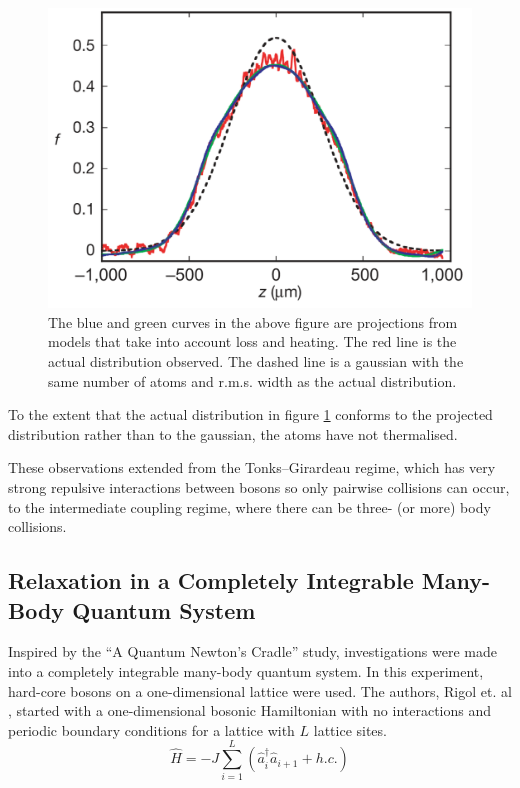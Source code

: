 \documentclass[a4paper, 10pt]{article}
\theoremstyle{plain}
\begin{document}
\begin{figure}[H]
    \begin{center}
    \includegraphics[width=1.0\textwidth]{dephased_momentum_distribution}
    \end{center}
    \caption{\label{dephased_momentum_distribution}
             The blue and green curves in the above figure are projections from
             models that take into account loss and heating. The red line is the
             actual distribution observed. The dashed line is a gaussian with
             the same number of atoms and r.m.s. width as the actual
             distribution.}
 \end{figure}


To the extent that the actual distribution in figure
\ref{dephased_momentum_distribution} conforms to the projected distribution
rather than to the gaussian, the atoms have not thermalised.

These observations extended from the Tonks--Girardeau regime, which has very
strong repulsive interactions between bosons so only pairwise collisions can
occur, to the intermediate coupling regime, where there can be three-
(or more) body collisions.


\subsection{Relaxation in a Completely Integrable Many-Body Quantum System}

Inspired by the ``A Quantum Newton's Cradle'' study, investigations were made
into a completely integrable many-body quantum system. In this experiment,
hard-core bosons on a one-dimensional lattice were used. The authors, Rigol et. al
\cite{Rigol2007}, started with a one-dimensional bosonic Hamiltonian with no
interactions and periodic boundary conditions for a lattice with $L$ lattice
sites.
\begin{equation}
 \hat{H}=-J\sum_{i=1}^{L} (\hat{a}_{i}^{\dagger}\hat{a}_{i+1}+h.c.)
\end{equation}
\end{document}
